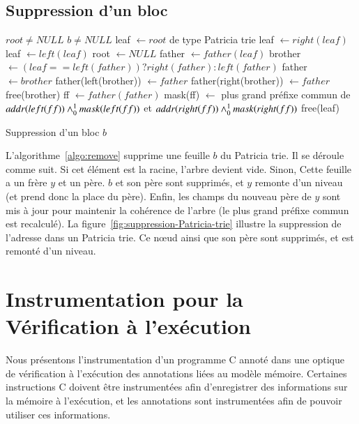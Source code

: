 \subsection{Suppression d'un bloc}

\begin{algorithm}
\begin{algorithmic}
\Require $root \neq NULL$
\Require $b \neq NULL$
\State leaf $\gets root$ de type Patricia trie
    \State leaf $\gets right(leaf)$
  \Else
    \State leaf $\gets left(leaf)$
  \EndIf
\EndWhile
{}
  \State root $\gets NULL$
\Else
  \State father $\gets father(leaf)$
  \State brother $\gets (leaf == left(father))? right(father) : left(father)$
  \State father $\gets brother$
    \State father(left(brother)) $\gets father$
    \State father(right(brother)) $\gets father$
  \EndIf
  \State free(brother)
  \State ff $\gets father(father)$
    \State mask(ff) $\gets$ plus grand préfixe commun de $addr(left(ff)) \land_0^1 mask(left(ff))$ et $addr(right(ff)) \land_0^1 mask(right(ff))$
  \EndIf
\EndIf
\State free(leaf)
\end{algorithmic}
\caption{Suppression d'un bloc $b$
  \label{algo:remove}}
\end{algorithm}




L'algorithme~\ref{algo:remove} supprime une feuille $b$ du Patricia trie.
Il se déroule comme suit.
Si cet élément est la racine, l'arbre devient vide.
Sinon, Cette feuille a un frère $y$ et un père.
$b$ et son père sont supprimés, et $y$ remonte d'un niveau (et prend donc la
place du père).
Enfin, les champs du nouveau père de $y$ sont mis à jour pour maintenir la
cohérence de l'arbre (le plus grand préfixe commun est recalculé).
La figure~\ref{fig:suppression-Patricia-trie} illustre la suppression de
l'adresse  dans un Patricia trie.
Ce n\oe{}ud ainsi que son père  sont supprimés, et
 est remonté d'un niveau.


\section{Instrumentation pour la Vérification à l'exécution}
\label{sec:mem-instru}


Nous présentons l'instrumentation d'un programme C annoté dans une optique de
vérification à l'exécution des annotations liées au modèle mémoire.
Certaines instructions C doivent être instrumentées afin d'enregistrer
des informations sur la mémoire à l'exécution, et les annotations sont
instrumentées afin de pouvoir utiliser ces informations.


